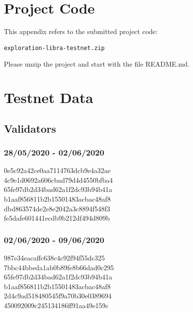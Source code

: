 \documentclass[12pt,openany,a4paper]{book}
\begin{document}
\appendix


\newpage
{}
\mbox{}
\newpage



\chapter{Project Code}
\label{appendix:project_code}
This appendix refers to the submitted project code: 
\begin{verbatim}
exploration-libra-testnet.zip
\end{verbatim}
Please unzip the project and start with the file README.md.


\chapter{Testnet Data}

\section{Validators}
\subsection{28/05/2020 - 02/06/2020}
\label{appendix:val_addr_1}
0e5c92a42ce0aa7114763dcb9e4a32ae \\
4c9e1d0692a606cbad79d4d4550bfba4 \\
65fe97db2d34bad62a1f2dc93b94b41a \\
b1aaf856811b2b15501483acbac48af8 \\
dbd863574de2e8e2042a3c8894f548f3 \\
fe5dafe601441ecdb9b212df494d809b \\

\subsection{02/06/2020 - 09/06/2020}
\label{appendix:val_addr_2}
987e34eacaffc638c4c92f94f55dc325 \\
7bbc44bbeda1ab0b89fe8b66dad0c295 \\
65fe97db2d34bad62a1f2dc93b94b41a \\
b1aaf856811b2b15501483acbac48af8 \\
2d4c9ad518480545f9a70b30e0389694 \\
450092009c245134186ff91aa49e159c \\
\end{document}
